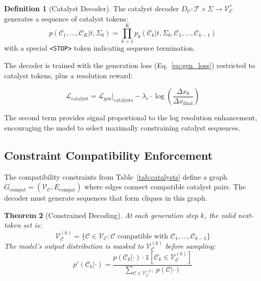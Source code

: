 \documentclass[11pt,twocolumn,a4paper]{article}
\newtheorem{theorem}{Theorem}[section]
\theoremstyle{definition}
\newtheorem{definition}[theorem]{Definition}
\theoremstyle{remark}
\newcommand{\Sig}{\Sigma}
\newcommand{\catalyst}{\mathcal{C}}
\newcommand{\loss}{\mathcal{L}}
\newcommand{\params}{\theta}
\newcommand{\vocab}{\mathcal{V}}
\begin{document}
\begin{definition}[Catalyst Decoder]
\label{def:catalyst_decoder}
The catalyst decoder $D_\catalyst: \mathcal{T} \times \Sig \to \vocab_\catalyst^*$ generates a sequence of catalyst tokens:
\begin{equation}
p(\catalyst_1, \ldots, \catalyst_K | t, \Sig_0) = \prod_{k=1}^{K} p_\params(\catalyst_k | t, \Sig_0, \catalyst_1, \ldots, \catalyst_{k-1})
\end{equation}
with a special \texttt{<STOP>} token indicating sequence termination.
\end{definition}

The decoder is trained with the generation loss (Eq.~\ref{eq:gen_loss}) restricted to catalyst tokens, plus a resolution reward:

\begin{equation}
\loss_{\text{catalyst}} = \loss_{\text{gen}}|_{\text{catalysts}} - \lambda_r \cdot \log\left(\frac{\Delta x_0}{\Delta x_{\mathrm{final}}}\right)
\end{equation}

The second term provides signal proportional to the log resolution enhancement, encouraging the model to select maximally constraining catalyst sequences.

\subsection{Constraint Compatibility Enforcement}

The compatibility constraints from Table~\ref{tab:catalysts} define a graph $G_{\text{compat}} = (\vocab_\catalyst, E_{\text{compat}})$ where edges connect compatible catalyst pairs. The decoder must generate sequences that form cliques in this graph.

\begin{theorem}[Constrained Decoding]
\label{thm:constrained_decoding}
At each generation step $k$, the valid next-token set is:
\begin{equation}
\vocab_\catalyst^{(k)} = \{\catalyst \in \vocab_\catalyst : \catalyst \text{ compatible with } \catalyst_1, \ldots, \catalyst_{k-1}\}
\end{equation}
The model's output distribution is masked to $\vocab_\catalyst^{(k)}$ before sampling:
\begin{equation}
p'(\catalyst_k | \cdot) = \frac{p(\catalyst_k | \cdot) \cdot \mathbb{1}[\catalyst_k \in \vocab_\catalyst^{(k)}]}{\sum_{\catalyst \in \vocab_\catalyst^{(k)}} p(\catalyst | \cdot)}
\end{equation}
\end{theorem}
\end{document}

